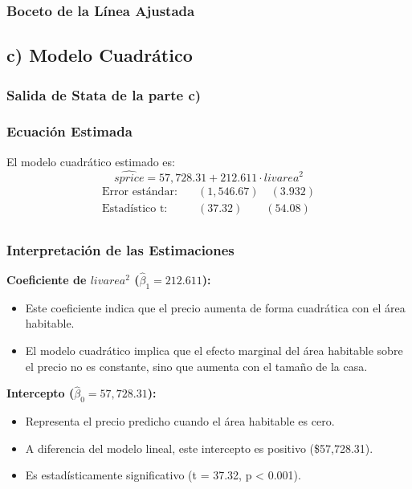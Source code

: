 \documentclass[12pt]{article}
\begin{document}
\subsubsection*{Boceto de la Línea Ajustada}

\subsection*{c) Modelo Cuadrático}

\subsubsection*{Salida de Stata de la parte c)}



\subsubsection*{Ecuación Estimada}
El modelo cuadrático estimado es:
\[
\widehat{sprice} = 57,728.31 + 212.611 \cdot livarea^2
\]
\begin{align}
\text{Error estándar:} \quad & (1,546.67) \quad (3.932) \\
\text{Estadístico t:} \quad & (37.32) \quad\quad (54.08) \\
\end{align}

\subsubsection*{Interpretación de las Estimaciones}

\textbf{Coeficiente de $livarea^2$ ($\hat{\beta}_1 = 212.611$):}
\begin{itemize}
    \item Este coeficiente indica que el precio aumenta de forma cuadrática con el área habitable.
   
    \item El modelo cuadrático implica que el efecto marginal del área habitable sobre el precio no es constante, sino que aumenta con el tamaño de la casa.
\end{itemize}

\textbf{Intercepto ($\hat{\beta}_0 = 57,728.31$):}
\begin{itemize}
    \item Representa el precio predicho cuando el área habitable es cero.
    \item A diferencia del modelo lineal, este intercepto es positivo (\$57,728.31).
    \item Es estadísticamente significativo (t = 37.32, p < 0.001).
\end{itemize}
\end{document}
